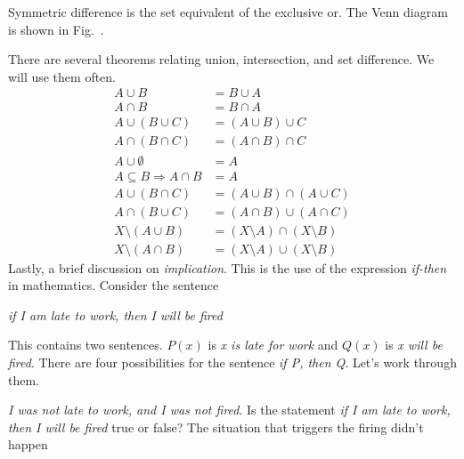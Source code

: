 \documentclass{article}
\theoremstyle{plain}
\theoremstyle{normal}
\begin{document}
        Symmetric difference is the set equivalent of the exclusive or.
        The Venn diagram is shown in
        Fig.~.
        \par\hfill\par
        There are several theorems relating union, intersection, and set
        difference. We will use them often.
        \begin{align}
            A\cup{B}&=B\cup{A}\tag{Commutativity of Unions}\\
            A\cap{B}&=B\cap{A}\tag{Commutativity of Intersections}\\
            A\cup(B\cup{C})&=(A\cup{B})\cup{C}\tag{Associativity of Unions}\\
            A\cap(B\cap{C})&=(A\cap{B})\cap{C}\tag{Associativity of Intersections}\\
            A\cup\emptyset&=A\tag{Identity Law of Unions}\\
            A\subseteq{B}\Rightarrow{A}\cap{B}&=A\tag{Identity Law of Intersections}\\
            A\cup(B\cap{C})&=(A\cup{B})\cap(A\cup{C})\tag{Distributive Law of Unions}\\
            A\cap(B\cup{C})&=(A\cap{B})\cup(A\cap{C})\tag{Distributive Law of Intersections}\\
            X\setminus(A\cup{B})&=(X\setminus{A})\cap(X\setminus{B})\tag{De Morgan's Law of Unions}\\
            X\setminus(A\cap{B})&=(X\setminus{A})\cup(X\setminus{B})\tag{De Morgan's Law of Intersections}
        \end{align}
        Lastly, a brief discussion on \textit{implication}. This is the use
        of the expression \textit{if-then} in mathematics. Consider the sentence
            \begin{center}
                \textit{if I am late to work, then I will be fired}
            \end{center}
            This contains two sentences. $P(x)$ is \textit{x is late for work}
            and $Q(x)$ is \textit{x will be fired}. There are four possibilities
            for the sentence \textit{if P, then Q}. Let's work through them.
            \par\hfill\par
            \textit{I was not late to work, and I was not fired}. Is the
            statement \textit{if I am late to work, then I will be fired}
            true or false? The situation that triggers the firing didn't happen
\end{document}
